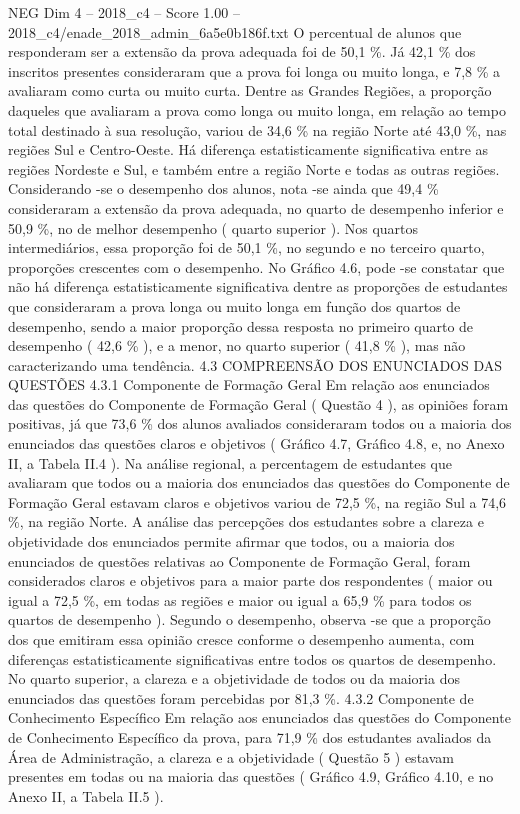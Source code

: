 \begin{textsample}{NEG Dim 4 – 2018\_c4 – Score 1.00 – 2018\_c4/enade\_2018\_admin\_6a5e0b186f.txt}
O percentual de alunos que responderam ser a extensão da prova adequada foi de 50,1 \%.
Já 42,1 \% dos inscritos presentes consideraram que a prova foi longa ou muito longa, e 7,8 \% a avaliaram como curta ou muito curta.
Dentre as Grandes Regiões, a proporção daqueles que avaliaram a prova como longa ou muito longa, em relação ao tempo total destinado à sua resolução, variou de 34,6 \% na região Norte até 43,0 \%, nas regiões Sul e Centro-Oeste.
Há diferença estatisticamente significativa entre as regiões Nordeste e Sul, e também entre a região Norte e todas as outras regiões.
Considerando -se o desempenho dos alunos, nota -se ainda que 49,4 \% consideraram a extensão da prova adequada, no quarto de desempenho inferior e 50,9 \%, no de melhor desempenho ( quarto superior ).
Nos quartos intermediários, essa proporção foi de 50,1 \%, no segundo e no terceiro quarto, proporções crescentes com o desempenho.
No Gráfico 4.6, pode -se constatar que não há diferença estatisticamente significativa dentre as proporções de estudantes que consideraram a prova longa ou muito longa em função dos quartos de desempenho, sendo a maior proporção dessa resposta no primeiro quarto de desempenho ( 42,6 \% ), e a menor, no quarto superior ( 41,8 \% ), mas não caracterizando uma tendência. 4.3 COMPREENSÃO DOS ENUNCIADOS DAS QUESTÕES 4.3.1 Componente de Formação Geral Em relação aos enunciados das questões do Componente de Formação Geral ( Questão 4 ), as opiniões foram positivas, já que 73,6 \% dos alunos avaliados consideraram todos ou a maioria dos enunciados das questões claros e objetivos ( Gráfico 4.7, Gráfico 4.8, e, no Anexo II, a Tabela II.4 ).
Na análise regional, a percentagem de estudantes que avaliaram que todos ou a maioria dos enunciados das questões do Componente de Formação Geral estavam claros e objetivos variou de 72,5 \%, na região Sul a 74,6 \%, na região Norte.
A análise das percepções dos estudantes sobre a clareza e objetividade dos enunciados permite afirmar que todos, ou a maioria dos enunciados de questões relativas ao Componente de Formação Geral, foram considerados claros e objetivos para a maior parte dos respondentes ( maior ou igual a 72,5 \%, em todas as regiões e maior ou igual a 65,9 \% para todos os quartos de desempenho ).
Segundo o desempenho, observa -se que a proporção dos que emitiram essa opinião cresce conforme o desempenho aumenta, com diferenças estatisticamente significativas entre todos os quartos de desempenho.
No quarto superior, a clareza e a objetividade de todos ou da maioria dos enunciados das questões foram percebidas por 81,3 \%. 4.3.2 Componente de Conhecimento Específico Em relação aos enunciados das questões do Componente de Conhecimento Específico da prova, para 71,9 \% dos estudantes avaliados da Área de Administração, a clareza e a objetividade ( Questão 5 ) estavam presentes em todas ou na maioria das questões ( Gráfico 4.9, Gráfico 4.10, e no Anexo II, a Tabela II.5 ).

\end{textsample}
